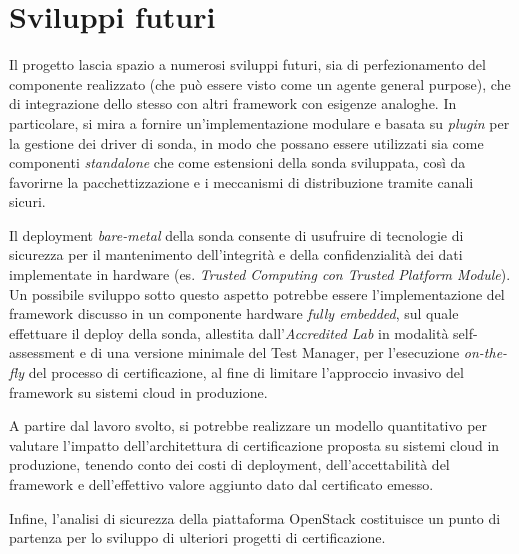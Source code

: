 \documentclass[../main.tex]{subfiles}
\begin{document}
\section*{Sviluppi futuri}
Il progetto lascia spazio a numerosi sviluppi futuri, sia di perfezionamento del componente realizzato (che può essere visto come un agente general purpose), che di integrazione dello stesso con altri framework con esigenze analoghe.
In particolare, si mira a fornire un'implementazione modulare e basata su \textit{plugin} per la gestione dei driver di sonda, in modo che possano essere utilizzati sia come componenti \textit{standalone} che come estensioni della sonda sviluppata, così da favorirne la pacchettizzazione e i meccanismi di distribuzione tramite canali sicuri.

Il deployment \textit{bare-metal} della sonda consente di usufruire di tecnologie di sicurezza per il mantenimento dell'integrità e della confidenzialità dei dati implementate in hardware (es. \textit{Trusted Computing con Trusted Platform Module}).
Un possibile sviluppo sotto questo aspetto potrebbe essere l'implementazione del framework discusso in un componente hardware \textit{fully embedded}, sul quale effettuare il deploy della sonda, allestita dall'\textit{Accredited Lab} in modalità self-assessment e di una versione minimale del Test Manager, per l'esecuzione \textit{on-the-fly} del processo di certificazione, al fine di limitare l'approccio invasivo del framework su sistemi cloud in produzione.

A partire dal lavoro svolto, si potrebbe realizzare un modello quantitativo per valutare l'impatto dell'architettura di certificazione proposta su sistemi cloud in produzione, tenendo conto dei costi di deployment, dell'accettabilità del framework e dell'effettivo valore aggiunto dato dal certificato emesso.

Infine, l'analisi di sicurezza della piattaforma OpenStack costituisce un punto di partenza per lo sviluppo di ulteriori progetti di certificazione.
\end{document}
